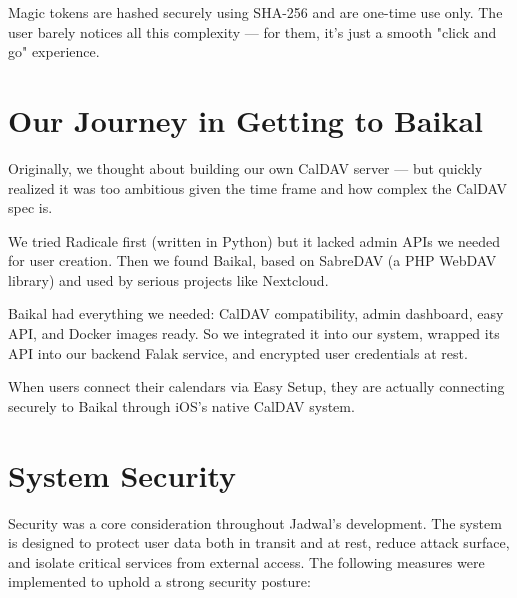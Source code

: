 Magic tokens are hashed securely using SHA-256 and are one-time use only. The user barely notices all this complexity — for them, it’s just a smooth "click and go" experience.

\section{Our Journey in Getting to Baikal}

Originally, we thought about building our own CalDAV server — but quickly realized it was too ambitious given the time frame and how complex the CalDAV spec is.

We tried Radicale first (written in Python) but it lacked admin APIs we needed for user creation. Then we found Baikal, based on SabreDAV (a PHP WebDAV library) and used by serious projects like Nextcloud.

Baikal had everything we needed: CalDAV compatibility, admin dashboard, easy API, and Docker images ready. So we integrated it into our system, wrapped its API into our backend Falak service, and encrypted user credentials at rest.

When users connect their calendars via Easy Setup, they are actually connecting securely to Baikal through iOS’s native CalDAV system.

\section{System Security}

Security was a core consideration throughout Jadwal's development. The system is designed to protect user data both in transit and at rest, reduce attack surface, and isolate critical services from external access. The following measures were implemented to uphold a strong security posture:

